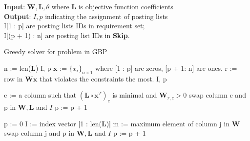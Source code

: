 \begin{algorithm}[!t]
\small
\begin{flushleft}
\textbf{Input}: $\mathbf W, \mathbf L, \theta$ where $\mathbf L$ is objective function coefficients \\
\textbf{Output}: $I, p$ indicating the assignment of posting lists \\
I[1 : p] are posting lists IDs in requirement set; \\
I[(p + 1) : n] are posting list IDs in \textbf{Skip}.
\end{flushleft}
\caption{Greedy solver for problem in GBP}
\label{alg0}
\begin{algorithmic}[1]

\State n := len($\mathbf L$)
        \State \Return I, p
\EndIf
\State $\boldsymbol x$ := $\{x_i\}_{n \times 1}$ where [1 : p] are zeros, [p + 1: n] are ones.
\State r := row in $\mathbf W \boldsymbol x$ that violates the constraints the most.
        \State \Return I, p
\EndIf

\State c := a column such that $(\mathbf L \circ \boldsymbol x^T)_c$ is minimal and $\mathbf W_{r, c} > 0$
\State swap column c and p in $\mathbf W, \mathbf L$ and $I$
\State p := p + 1
\State \Return {}
\EndFunction

\State p := 0
\State I := index vector [1 : len($\mathbf L$)]
        \State m := maximum element of column j in $\mathbf W$
        \State swap column j and p in $\mathbf W, \mathbf L$ and $I$
        \State p := p + 1
        \EndIf
\EndFor
\State \Return {}
\EndFunction
\end{algorithmic}
\end{algorithm}